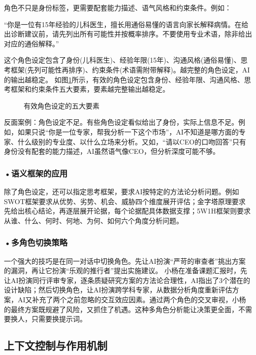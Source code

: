 角色不只是身份标签，更需要配套能力描述、语气风格和约束条件。例如：

\begin{lightquote}
“你是一位有15年经验的儿科医生，擅长用通俗易懂的语言向家长解释病情。在给出诊断建议前，请先列出所有可能性并按概率排序。不要使用专业术语，除非给出对应的通俗解释。”
\end{lightquote}

这个角色设定包含了身份(儿科医生)、经验年限(15年)、沟通风格(通俗易懂)、思考框架(先列可能性再排序)、约束条件(术语需附带解释)。越完整的角色设定，AI的输出越稳定。 如图\ref{fig:ch3_3_5}所示，有效的角色设定包含身份、经验年限、沟通风格、思考框架和约束条件五大要素，要素越完整输出越稳定。

\begin{figure}[H]
\centering
{}
\caption{有效角色设定的五大要素}
\label{fig:ch3_3_5}
\end{figure}

反面案例：角色设定不足。有些角色设定看似给出了身份，实际上信息不足。例如，如果只说“你是一位专家，帮我分析一下这个市场”，AI不知道是哪方面的专家、什么级别的专业度、以什么立场来分析。又如，“请以CEO的口吻回答”只有身份没有配套的能力描述，AI虽然语气像CEO，但分析深度可能不够。


\subsubsection*{\textbf{•语义框架的应用}}
除了角色设定，还可以指定思考框架，要求AI按特定的方法论分析问题。例如SWOT框架要求从优势、劣势、机会、威胁四个维度展开评估；金字塔原理要求先给出核心结论，再逐层展开论据，每个论据配具体数据支撑；5W1H框架则要求从谁、什么、何时、何地、为何、如何六个角度分析问题。


\subsubsection*{\textbf{•多角色切换策略}}
一个强大的技巧是在同一对话中切换角色。先让AI扮演“严苛的审查者”挑出方案的漏洞，再让它扮演“乐观的推行者”提出实施建议。 小杨在准备课题汇报时，先让AI扮演同行评审专家，逐条质疑研究方案的方法论合理性，AI指出了3个潜在的设计缺陷；然后切换角色，让AI扮演跨学科专家，从数据分析角度重新评估方案，AI又补充了两个之前忽略的交互效应因素。通过两个角色的交叉审视，小杨的最终方案既规避了风险，又抓住了机遇。这种多角色分析能让决策更全面，不需要换人，只需要换提示词。

\subsection{上下文控制与作用机制}


